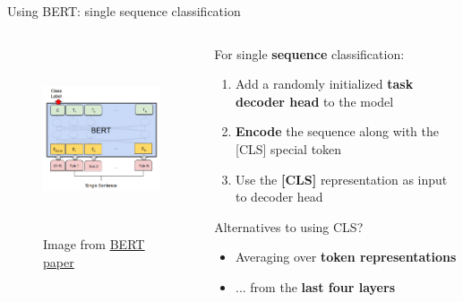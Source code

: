 \documentclass[12pt,aspectratio=169,handout]{beamer}
\begin{document}
\begin{frame}{Using BERT: single sequence classification}
	\begin{columns}[T] %
		\begin{column}{.48\textwidth}
		\begin{figure}[h]
			\includegraphics[height=5.5cm]{bert-single-sentence-clf}
			\caption*{Image from \href{https://arxiv.org/pdf/1810.04805.pdf}{\underline{BERT paper}}}
		\end{figure}
	\end{column}
	
	\begin{column}{.48\textwidth}
		For single \textbf{sequence} classification:
		\begin{enumerate}
			\item Add a randomly initialized \textbf{task decoder head} to the model
			\pause
			\item \textbf{Encode} the sequence along with the [CLS] special token
			\pause
			\item Use the \textbf{[CLS]} representation as input to decoder head
		\end{enumerate}
		\pause
		Alternatives to using CLS?
		\begin{itemize}
			\item Averaging over \textbf{token representations}
			\pause
			\item ... from the \textbf{last four layers}
		\end{itemize}
	\end{column}
\end{columns}
\end{frame}
\end{document}
